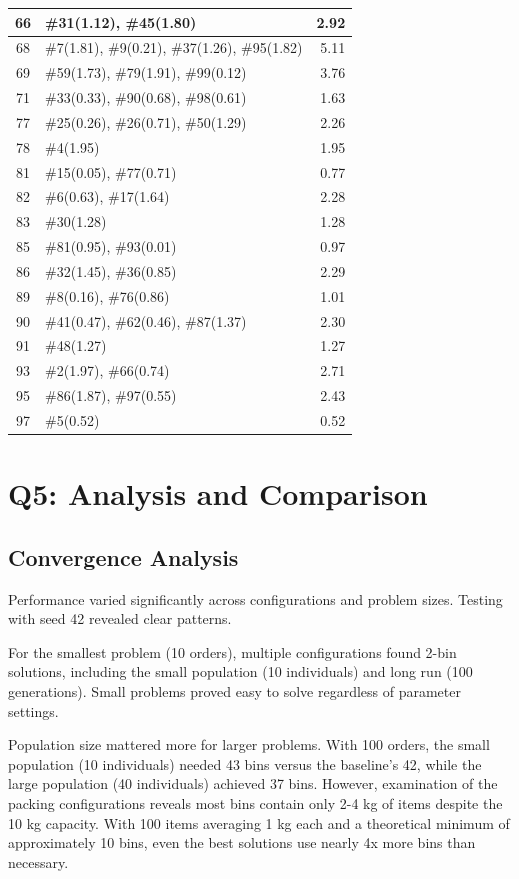 \documentclass[journal,12pt,onecolumn]{IEEEtran}
\begin{document}
\begin{table}[htbp!]
\begin{tabular}{|c|l|r|}
\hline
66 & \#31(1.12), \#45(1.80) & 2.92 \\
\hline
68 & \#7(1.81), \#9(0.21), \#37(1.26), \#95(1.82) & 5.11 \\
\hline
69 & \#59(1.73), \#79(1.91), \#99(0.12) & 3.76 \\
\hline
71 & \#33(0.33), \#90(0.68), \#98(0.61) & 1.63 \\
\hline
77 & \#25(0.26), \#26(0.71), \#50(1.29) & 2.26 \\
\hline
78 & \#4(1.95) & 1.95 \\
\hline
81 & \#15(0.05), \#77(0.71) & 0.77 \\
\hline
82 & \#6(0.63), \#17(1.64) & 2.28 \\
\hline
83 & \#30(1.28) & 1.28 \\
\hline
85 & \#81(0.95), \#93(0.01) & 0.97 \\
\hline
86 & \#32(1.45), \#36(0.85) & 2.29 \\
\hline
89 & \#8(0.16), \#76(0.86) & 1.01 \\
\hline
90 & \#41(0.47), \#62(0.46), \#87(1.37) & 2.30 \\
\hline
91 & \#48(1.27) & 1.27 \\
\hline
93 & \#2(1.97), \#66(0.74) & 2.71 \\
\hline
95 & \#86(1.87), \#97(0.55) & 2.43 \\
\hline
97 & \#5(0.52) & 0.52 \\
\hline
\end{tabular}
\end{table}

\section{Q5: Analysis and Comparison}
\subsection{Convergence Analysis}

Performance varied significantly across configurations and problem sizes. Testing with seed 42 revealed clear patterns.

For the smallest problem (10 orders), multiple configurations found 2-bin solutions, including the small population (10 individuals) and long run (100 generations). Small problems proved easy to solve regardless of parameter settings.

Population size mattered more for larger problems. With 100 orders, the small population (10 individuals) needed 43 bins versus the baseline's 42, while the large population (40 individuals) achieved 37 bins. However, examination of the packing configurations reveals most bins contain only 2-4 kg of items despite the 10 kg capacity. With 100 items averaging 1 kg each and a theoretical minimum of approximately 10 bins, even the best solutions use nearly 4x more bins than necessary.
\end{document}
